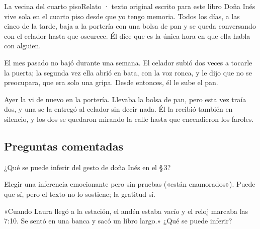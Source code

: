\begin{texto}{La vecina del cuarto piso}{Relato · texto original escrito para este libro}
\pa Doña Inés vive sola en el cuarto piso desde que yo tengo memoria. Todos los días, a las cinco de la tarde, baja a la
portería con una bolsa de pan y se queda conversando con el celador hasta que oscurece. Él dice que es la única hora en que
ella habla con alguien.

\pa El mes pasado no bajó durante una semana. El celador subió dos veces a tocarle la puerta; la segunda vez ella abrió en
bata, con la voz ronca, y le dijo que no se preocupara, que era solo una gripa. Desde entonces, él le sube el pan.

\pa Ayer la vi de nuevo en la portería. Llevaba la bolsa de pan, pero esta vez traía dos, y una se la entregó al celador
sin decir nada. Él la recibió también en silencio, y los dos se quedaron mirando la calle hasta que encendieron los
faroles.
\end{texto}

\subsection{Preguntas comentadas}
\begin{comentada}{¿Qué se puede inferir del gesto de doña Inés en el \S\,3?}
\end{comentada}

\begin{trampa}
Elegir una inferencia emocionante pero sin pruebas («están enamorados»). Puede que sí, pero el texto no lo sostiene; la
gratitud sí.
\end{trampa}

\begin{reto}
«Cuando Laura llegó a la estación, el andén estaba vacío y el reloj marcaba las 7:10. Se sentó en una banca y sacó un libro
largo.» ¿Qué se puede inferir?
\end{reto}

